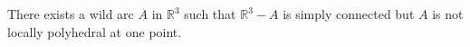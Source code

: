 There exists a wild arc $A$ in $\mathbb{R}^3$ such that $\mathbb{R}^3 - A$ is simply connected but $A$ is not locally polyhedral at one point.
